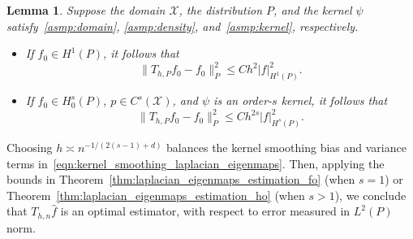 \documentclass{article}
\newcommand{\1}{\mathbf{1}}
\newcommand{\mc}[1]{\mathcal{#1}}
\newcommand{\wh}[1]{\widehat{#1}}
\theoremstyle{alden}
\theoremstyle{aldenthm}
\newtheorem{lemma}{Lemma}
\theoremstyle{definition}
\theoremstyle{remark}
\begin{document}
\begin{lemma}
	\label{lem:kernel_smoothing_bias}
	Suppose the domain $\mc{X}$, the distribution $P$, and the kernel $\psi$  satisfy~\ref{asmp:domain}, \ref{asmp:density}, and~\ref{asmp:kernel}, respectively. 
	\begin{itemize}
		\item If $f_0 \in H^1(P)$, it follows that
		\begin{equation*}
		\|T_{h,P}f_0 - f_0\|_P^2 \leq C h^{2} |f|_{H^1(P)}^2.
		\end{equation*}
		\item If $f_0 \in H_0^{s}(P)$, $p \in C^{s}(\mc{X})$, and $\psi$ is an order-$s$ kernel, it follows that
		\begin{equation*}
		\|T_{h,P}f_0 - f_0\|_P^2 \leq C h^{2s} |f|_{H^s(P)}^2.
		\end{equation*}
	\end{itemize}
\end{lemma}
Choosing $h \asymp n^{-1/(2(s - 1) + d)}$ balances the kernel smoothing bias and variance terms in~\eqref{eqn:kernel_smoothing_laplacian_eigenmaps}. Then, applying the bounds in Theorem~\ref{thm:laplacian_eigenmaps_estimation_fo} (when $s = 1$) or Theorem~\ref{thm:laplacian_eigenmaps_estimation_ho} (when $s > 1$), we conclude that $T_{h,n}\wh{f}$ is an optimal estimator, with respect to error measured in $L^2(P)$ norm.
\end{document}

